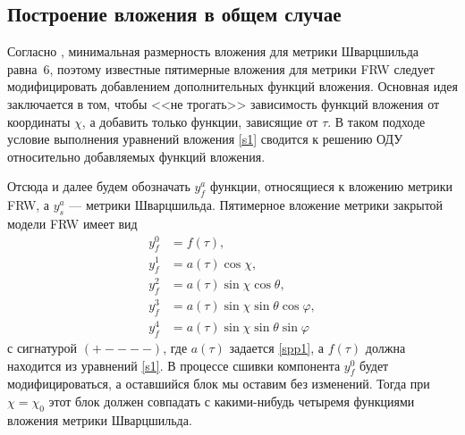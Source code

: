 \documentclass[12pt]{article}
\begin{document}
\subsection{Построение вложения в общем случае}
Согласно \cite{kasner2}, минимальная размерность вложения для метрики Шварцшильда равна~$6$, поэтому известные пятимерные вложения для метрики FRW
\cite{robertson1933,rosen65} следует модифицировать добавлением дополнительных функций вложения. Основная идея заключается в том, чтобы <<не трогать>> зависимость функций вложения от координаты $\chi$, а добавить только функции, зависящие от $\tau$. В таком подходе условие выполнения уравнений вложения \eqref{s1} сводится к решению ОДУ относительно добавляемых функций вложения.

Отсюда и далее будем обозначать $y^a_f$ функции, относящиеся к вложению метрики FRW, а $y^a_s$ --- метрики Шварцшильда.
Пятимерное вложение метрики закрытой модели FRW имеет вид
\begin{align}
	y^0_f &= f(\tau), \\
\label{0}	y^1_f &= a(\tau) \cos{\chi}, \\
\label{1}	y^2_f &= a(\tau) \sin{\chi} \cos{\theta}, \\
\label{2}	y^3_f &= a(\tau) \sin{\chi} \sin{\theta} \cos{\varphi}, \\
\label{3}	y^4_f &= a(\tau) \sin{\chi} \sin{\theta} \sin{\varphi}
\end{align}
с сигнатурой $(+----)$, где $a(\tau)$ задается \eqref{spp1}, а $f(\tau)$ должна находится из уравнений \eqref{s1}.
В процессе сшивки компонента $y^0_f$ будет модифицироваться, а оставшийся блок мы оставим без изменений. Тогда при $\chi = \chi_0$ этот блок должен совпадать с какими-нибудь четыремя функциями вложения метрики Шварцшильда.
\end{document}
